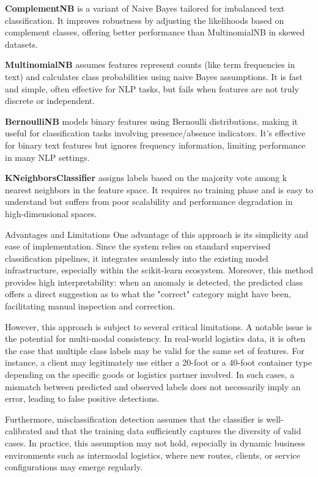 {\bf ComplementNB} is a variant of Naive Bayes tailored for imbalanced text classification. It improves robustness by adjusting the likelihoods based on complement classes, offering better performance than MultinomialNB in skewed datasets.

{\bf MultinomialNB} assumes features represent counts (like term frequencies in text) and calculates class probabilities using naive Bayes assumptions. It is fast and simple, often effective for NLP tasks, but fails when features are not truly discrete or independent.

{\bf BernoulliNB} models binary features using Bernoulli distributions, making it useful for classification tasks involving presence/absence indicators. It’s effective for binary text features but ignores frequency information, limiting performance in many NLP settings.

{\bf KNeighborsClassifier} assigns labels based on the majority vote among k nearest neighbors in the feature space. It requires no training phase and is easy to understand but suffers from poor scalability and performance degradation in high-dimensional spaces.


\secc Advantages and Limitations
One advantage of this approach is its simplicity and ease of implementation. Since the system relies on standard supervised classification pipelines, it integrates seamlessly into the existing model infrastructure, especially within the scikit-learn ecosystem. Moreover, this method provides high interpretability: when an anomaly is detected, the predicted class offers a direct suggestion as to what the "correct" category might have been, facilitating manual inspection and correction.

However, this approach is subject to several critical limitations. A notable issue is the potential for multi-modal consistency. In real-world logistics data, it is often the case that multiple class labels may be valid for the same set of features. For instance, a client may legitimately use either a 20-foot or a 40-foot container type depending on the specific goods or logistics partner involved. In such cases, a mismatch between predicted and observed labels does not necessarily imply an error, leading to false positive detections.

Furthermore, misclassification detection assumes that the classifier is well-calibrated and that the training data sufficiently captures the diversity of valid cases. In practice, this assumption may not hold, especially in dynamic business environments such as intermodal logistics, where new routes, clients, or service configurations may emerge regularly.

